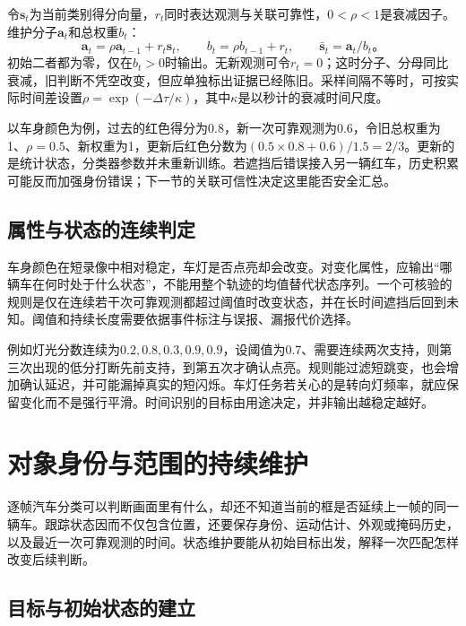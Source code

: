 令$\bm{s}_t$为当前类别得分向量，$r_t$同时表达观测与关联可靠性，$0<\rho<1$是衰减因子。维护分子$\bm{a}_t$和总权重$b_t$：
\begin{equation}
  \bm{a}_t=\rho\bm{a}_{t-1}+r_t\bm{s}_t,\qquad
  b_t=\rho b_{t-1}+r_t,\qquad
  \bar{\bm{s}}_t=\bm{a}_t/b_t\text{。}
  \label{eq:vision-video-decay}
\end{equation}
初始二者都为零，仅在$b_t>0$时输出。无新观测可令$r_t=0$；这时分子、分母同比衰减，旧判断不凭空改变，但应单独标出证据已经陈旧。采样间隔不等时，可按实际时间差设置$\rho=\exp(-\Delta\tau/\kappa)$，其中$\kappa$是以秒计的衰减时间尺度。

以车身颜色为例，过去的红色得分为0.8，新一次可靠观测为0.6，令旧总权重为1、$\rho=0.5$、新权重为1，更新后红色分数为$(0.5\times0.8+0.6)/1.5=2/3$。更新的是统计状态，分类器参数并未重新训练。若遮挡后错误接入另一辆红车，历史积累可能反而加强身份错误；下一节的关联可信性决定这里能否安全汇总。

\subsection{属性与状态的连续判定}
\label{sec:vision-video-continuous-attributes}

车身颜色在短录像中相对稳定，车灯是否点亮却会改变。对变化属性，应输出“哪辆车在何时处于什么状态”，不能用整个轨迹的均值替代状态序列。一个可核验的规则是仅在连续若干次可靠观测都超过阈值时改变状态，并在长时间遮挡后回到未知。阈值和持续长度需要依据事件标注与误报、漏报代价选择。

例如灯光分数连续为$0.2,0.8,0.3,0.9,0.9$，设阈值为0.7、需要连续两次支持，则第三次出现的低分打断先前支持，到第五次才确认点亮。规则能过滤短跳变，也会增加确认延迟，并可能漏掉真实的短闪烁。车灯任务若关心的是转向灯频率，就应保留变化而不是强行平滑。时间识别的目标由用途决定，并非输出越稳定越好。

\section{对象身份与范围的持续维护}
\label{sec:vision-video-tracking}

逐帧汽车分类可以判断画面里有什么，却还不知道当前的框是否延续上一帧的同一辆车。跟踪状态因而不仅包含位置，还要保存身份、运动估计、外观或掩码历史，以及最近一次可靠观测的时间。状态维护要能从初始目标出发，解释一次匹配怎样改变后续判断。

\subsection{目标与初始状态的建立}
\label{sec:vision-video-initialization}

